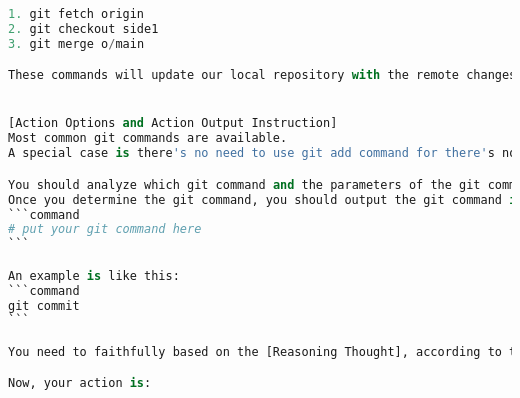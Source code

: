 \begin{lstlisting}[language=Python]
1. git fetch origin
2. git checkout side1
3. git merge o/main

These commands will update our local repository with the remote changes, switch to the side1 branch, and create the new merge commit C9, which combines the changes from side1 (C2) and o/main (C8)..


[Action Options and Action Output Instruction]
Most common git commands are available.
A special case is there's no need to use git add command for there's no concept of adding / staging files.

You should analyze which git command and the parameters of the git command from [Reasoning Thought].
Once you determine the git command, you should output the git command in the following format:
```command
# put your git command here
```

An example is like this:
```command
git commit
```

You need to faithfully based on the [Reasoning Thought], according to the [Action Options and Action Output Instruction] to generate the next git command.

Now, your action is:

    
\end{lstlisting}

